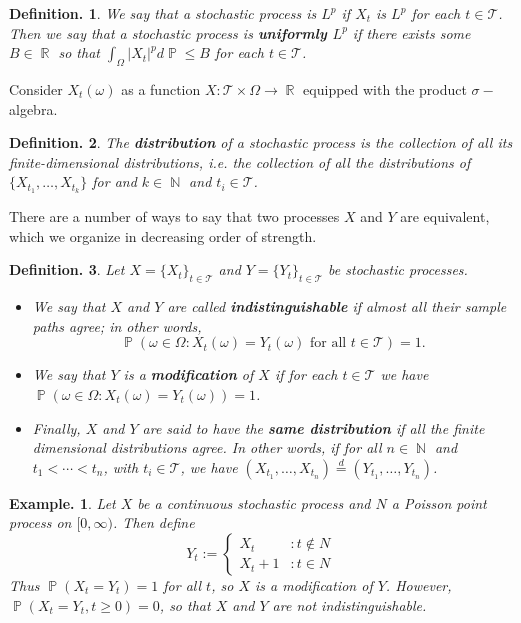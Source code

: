 \documentclass[11pt, a4paper]{memoir}
\DeclareMathOperator{\N}{{\mathbb{N}}}
\DeclareMathOperator{\R}{{\mathbb{R}}}
\theoremstyle{change}
\theoremstyle{plain}
\theoremstyle{nonumberplain}
\newtheorem{definition}{Definition.}
\newtheorem{example}{Example.}
\DeclareMathOperator{\pr}{{\mathbb{P}}}
\newcommand{\defn}[1]{{\boldmath\bfseries #1}}
\numberwithin{equation}{section}
\begin{document}
\begin{definition}
    We say that a stochastic process is \defn{$L^p$} if $X_t$ is $L^p$ for each $t\in\mathcal{T}$.
    Then we say that a stochastic process is \defn{uniformly $L^p$} if there exists some $B\in\R$ so that $\int_\Omega|X_t|^pd\pr\leq B$ for each $t\in\mathcal{T}$.
\end{definition}
Consider $X_t(\omega)$ as a function $X:\mathcal{T}\times\Omega\to \R$ equipped with the product $\sigma-$algebra.
\begin{definition}
    The \defn{distribution} of a stochastic process is the collection of all its finite-dimensional distributions, i.e. the collection of all the distributions of $\{X_{t_1},\ldots,X_{t_k}\}$ for and $k\in\N$ and $t_i\in \mathcal{T}$.
\end{definition}
There are a number of ways to say that two processes $X$ and $Y$ are equivalent, which we organize in decreasing order of strength.
\begin{definition}
    Let $X=\{X_t\}_{t\in \mathcal{T}}$ and $Y=\{Y_t\}_{t\in \mathcal{T}}$ be stochastic processes.
    \begin{itemize}[nl]
        \item We say that $X$ and $Y$ are called \defn{indistinguishable} if almost all their sample paths agree; in other words,
            \begin{equation*}
                \pr(\omega\in\Omega:X_t(\omega)=Y_t(\omega)\text{ for all }t\in \mathcal{T})=1.
            \end{equation*}
        \item We say that $Y$ is a \defn{modification} of $X$ if for each $t\in \mathcal{T}$ we have $\pr(\omega\in\Omega:X_t(\omega)=Y_t(\omega))=1$.
        \item Finally, $X$ and $Y$ are said to have the \defn{same distribution} if all the finite dimensional distributions agree.
            In other words, if for all $n\in\N$ and $t_1<\cdots<t_n$, with $t_i\in \mathcal{T}$, we have $(X_{t_1},\ldots,X_{t_n})\overset{d}{=}(Y_{t_1},\ldots,Y_{t_n})$.
    \end{itemize}
\end{definition}
\begin{example}
    Let $X$ be a continuous stochastic process and $N$ a Poisson point process on $[0,\infty)$.
    Then define
    \begin{equation*}
        Y_t :=
        \begin{cases}
            X_t &: t\notin N\\
            X_t+1 &:t\in N
        \end{cases}
    \end{equation*}
    Thus $\pr(X_t=Y_t)=1$ for all $t$, so $X$ is a modification of $Y$.
    However, $\pr(X_t=Y_t,t\geq 0)=0$, so that $X$ and $Y$ are not indistinguishable.
\end{example}
\end{document}

